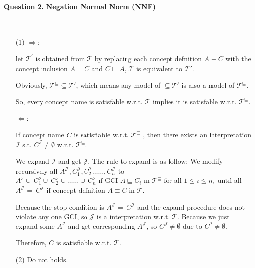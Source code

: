 \documentclass[12pt]{article}
\begin{document}
    \paragraph{Question 2. Negation Normal Norm (NNF)}~{}
    \\
    \begin{enumerate}
    \item[(1)]
	$\Longrightarrow$: \par
    let $\mathcal{T}^{'}$ is obtained from $\mathcal{T}$ by replacing each concept defnition $A \equiv C$ with the concept inclusion $A \sqsubseteq C$ and $C \sqsubseteq A$, $\mathcal{T}$ is equivalent to $\mathcal{T}'$. \par
    Obviously, $\mathcal{T}^{\sqsubseteq} \subseteq \mathcal{T}'$, which means any model of $\subseteq \mathcal{T}'$ is also a model of $\mathcal{T}^{\sqsubseteq}$.\par
    So, every concept name is satisfable w.r.t. $\mathcal{T}$ implies it is satisfable w.r.t. $\mathcal{T}^{\sqsubseteq}$.\par
    $\Longleftarrow$: \par
    If concept name $C$ is satisfiable w.r.t. $\mathcal{T}^{\sqsubseteq}$ , then there exists an interpretation $\mathcal{I}$  s.t. $C^{\mathcal{I}}\not = \emptyset$ w.r.t. $\mathcal{T}^{\sqsubseteq}$. \par
    We expand $\mathcal{I}$ and get $\mathcal{J}$. 
    The rule to expand is as follow: We modify recursively all $A^{\mathcal{J}^{}},C_1^{\mathcal{J}},C_2^{\mathcal{I}}……,C_n^{\mathcal{J}}$ to $A^{\mathcal{I}}\cup \ C_1^{\mathcal{I}}\cup \ C_2^{\mathcal{I}}\cup……\cup \ C_n^{\mathcal{I}} \text { if GCI }  A \sqsubseteq C_i \text { in } \mathcal{T} ^\sqsubseteq $ for all $1\le i\le n,$ until all $A^{\mathcal{J}^{}} =\ C^{\mathcal{J}} \text { if concept defnition } A \equiv C \text { in } \mathcal{T}$. \par
    Because the stop condition is $A^{\mathcal{J}^{}} =\ C^{\mathcal{J}}$ and the expand procedure does not violate any one GCI, so $\mathcal{J}$ is a interpretation w.r.t. $\mathcal{T}$. Because we just expand some $A^{\mathcal{I}}$ and get corresponding $A^{\mathcal{J}}$, so $C^{\mathcal{J}} \neq \emptyset$ due to $C^{\mathcal{I}} \neq \emptyset$.\par
    Therefore, $C$ is satisfiable w.r.t. $\mathcal{T}$.
    \item[(2)]
    Do not holds. \par
    \begin{equation}
        \begin{aligned}

\end{aligned}
\end{equation}
\end{enumerate}
\end{document}

